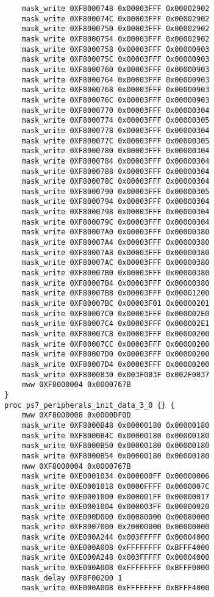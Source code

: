 \begin{lstlisting}
    mask_write 0XF8000748 0x00003FFF 0x00002902
    mask_write 0XF800074C 0x00003FFF 0x00002902
    mask_write 0XF8000750 0x00003FFF 0x00002902
    mask_write 0XF8000754 0x00003FFF 0x00002902
    mask_write 0XF8000758 0x00003FFF 0x00000903
    mask_write 0XF800075C 0x00003FFF 0x00000903
    mask_write 0XF8000760 0x00003FFF 0x00000903
    mask_write 0XF8000764 0x00003FFF 0x00000903
    mask_write 0XF8000768 0x00003FFF 0x00000903
    mask_write 0XF800076C 0x00003FFF 0x00000903
    mask_write 0XF8000770 0x00003FFF 0x00000304
    mask_write 0XF8000774 0x00003FFF 0x00000305
    mask_write 0XF8000778 0x00003FFF 0x00000304
    mask_write 0XF800077C 0x00003FFF 0x00000305
    mask_write 0XF8000780 0x00003FFF 0x00000304
    mask_write 0XF8000784 0x00003FFF 0x00000304
    mask_write 0XF8000788 0x00003FFF 0x00000304
    mask_write 0XF800078C 0x00003FFF 0x00000304
    mask_write 0XF8000790 0x00003FFF 0x00000305
    mask_write 0XF8000794 0x00003FFF 0x00000304
    mask_write 0XF8000798 0x00003FFF 0x00000304
    mask_write 0XF800079C 0x00003FFF 0x00000304
    mask_write 0XF80007A0 0x00003FFF 0x00000380
    mask_write 0XF80007A4 0x00003FFF 0x00000380
    mask_write 0XF80007A8 0x00003FFF 0x00000380
    mask_write 0XF80007AC 0x00003FFF 0x00000380
    mask_write 0XF80007B0 0x00003FFF 0x00000380
    mask_write 0XF80007B4 0x00003FFF 0x00000380
    mask_write 0XF80007B8 0x00003FFF 0x00001200
    mask_write 0XF80007BC 0x00003F01 0x00000201
    mask_write 0XF80007C0 0x00003FFF 0x000002E0
    mask_write 0XF80007C4 0x00003FFF 0x000002E1
    mask_write 0XF80007C8 0x00003FFF 0x00000200
    mask_write 0XF80007CC 0x00003FFF 0x00000200
    mask_write 0XF80007D0 0x00003FFF 0x00000200
    mask_write 0XF80007D4 0x00003FFF 0x00000200
    mask_write 0XF8000830 0x003F003F 0x002F0037
	mww 0XF8000004 0x0000767B
}
proc ps7_peripherals_init_data_3_0 {} {
	mww 0XF8000008 0x0000DF0D
    mask_write 0XF8000B48 0x00000180 0x00000180
    mask_write 0XF8000B4C 0x00000180 0x00000180
    mask_write 0XF8000B50 0x00000180 0x00000180
    mask_write 0XF8000B54 0x00000180 0x00000180
	mww 0XF8000004 0x0000767B
    mask_write 0XE0001034 0x000000FF 0x00000006
    mask_write 0XE0001018 0x0000FFFF 0x0000007C
    mask_write 0XE0001000 0x000001FF 0x00000017
    mask_write 0XE0001004 0x000003FF 0x00000020
    mask_write 0XE000D000 0x00080000 0x00080000
    mask_write 0XF8007000 0x20000000 0x00000000
    mask_write 0XE000A244 0x003FFFFF 0x00004000
    mask_write 0XE000A008 0xFFFFFFFF 0xBFFF4000
    mask_write 0XE000A248 0x003FFFFF 0x00004000
    mask_write 0XE000A008 0xFFFFFFFF 0xBFFF0000
    mask_delay 0XF8F00200 1
    mask_write 0XE000A008 0xFFFFFFFF 0xBFFF4000

\end{lstlisting}
